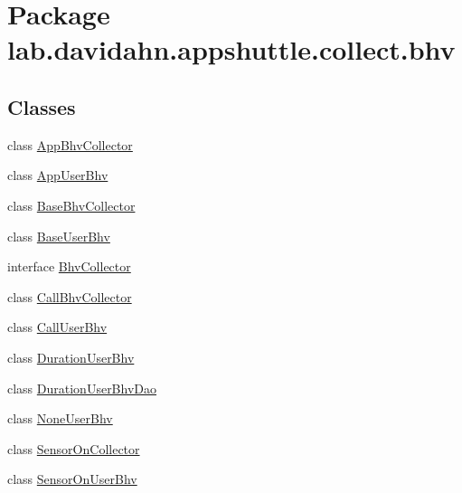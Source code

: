\hypertarget{namespacelab_1_1davidahn_1_1appshuttle_1_1collect_1_1bhv}{\section{\-Package lab.\-davidahn.\-appshuttle.\-collect.\-bhv}
\label{namespacelab_1_1davidahn_1_1appshuttle_1_1collect_1_1bhv}
}
\subsection*{\-Classes}
\begin{DoxyCompactItemize}
\item 
class \hyperlink{classlab_1_1davidahn_1_1appshuttle_1_1collect_1_1bhv_1_1_app_bhv_collector}{\-App\-Bhv\-Collector}
\item 
class \hyperlink{classlab_1_1davidahn_1_1appshuttle_1_1collect_1_1bhv_1_1_app_user_bhv}{\-App\-User\-Bhv}
\item 
class \hyperlink{classlab_1_1davidahn_1_1appshuttle_1_1collect_1_1bhv_1_1_base_bhv_collector}{\-Base\-Bhv\-Collector}
\item 
class \hyperlink{classlab_1_1davidahn_1_1appshuttle_1_1collect_1_1bhv_1_1_base_user_bhv}{\-Base\-User\-Bhv}
\item 
interface \hyperlink{interfacelab_1_1davidahn_1_1appshuttle_1_1collect_1_1bhv_1_1_bhv_collector}{\-Bhv\-Collector}
\item 
class \hyperlink{classlab_1_1davidahn_1_1appshuttle_1_1collect_1_1bhv_1_1_call_bhv_collector}{\-Call\-Bhv\-Collector}
\item 
class \hyperlink{classlab_1_1davidahn_1_1appshuttle_1_1collect_1_1bhv_1_1_call_user_bhv}{\-Call\-User\-Bhv}
\item 
class \hyperlink{classlab_1_1davidahn_1_1appshuttle_1_1collect_1_1bhv_1_1_duration_user_bhv}{\-Duration\-User\-Bhv}
\item 
class \hyperlink{classlab_1_1davidahn_1_1appshuttle_1_1collect_1_1bhv_1_1_duration_user_bhv_dao}{\-Duration\-User\-Bhv\-Dao}
\item 
class \hyperlink{classlab_1_1davidahn_1_1appshuttle_1_1collect_1_1bhv_1_1_none_user_bhv}{\-None\-User\-Bhv}
\item 
class \hyperlink{classlab_1_1davidahn_1_1appshuttle_1_1collect_1_1bhv_1_1_sensor_on_collector}{\-Sensor\-On\-Collector}
\item 
class \hyperlink{classlab_1_1davidahn_1_1appshuttle_1_1collect_1_1bhv_1_1_sensor_on_user_bhv}{\-Sensor\-On\-User\-Bhv}

\end{DoxyCompactItemize}
